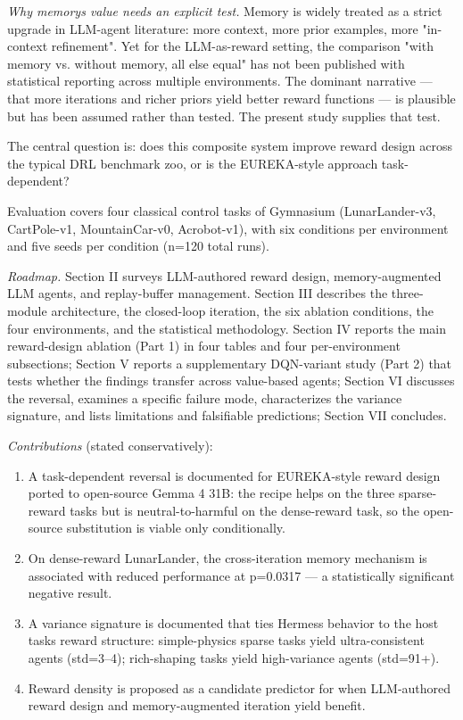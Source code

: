 \documentclass[conference,letterpaper,10pt]{IEEEtran}
\providecommand{\tightlist}{\setlength{\itemsep}{0pt}\setlength{\parskip}{0pt}}
\begin{document}
\emph{Why memory\textquotesingle s value needs an explicit test.} Memory is widely treated as a strict upgrade in LLM-agent literature: more context, more prior examples, more "in-context refinement". Yet for the LLM-as-reward setting, the comparison "with memory vs. without memory, all else equal" has not been published with statistical reporting across multiple environments. The dominant narrative --- that more iterations and richer priors yield better reward functions --- is plausible but has been assumed rather than tested. The present study supplies that test.

The central question is: does this composite system improve reward design across the typical DRL benchmark zoo, or is the EUREKA-style approach task-dependent?

Evaluation covers four classical control tasks of Gymnasium (LunarLander-v3, CartPole-v1, MountainCar-v0, Acrobot-v1), with six conditions per environment and five seeds per condition (n=120 total runs).

\emph{Roadmap.} Section II surveys LLM-authored reward design, memory-augmented LLM agents, and replay-buffer management. Section III describes the three-module architecture, the closed-loop iteration, the six ablation conditions, the four environments, and the statistical methodology. Section IV reports the main reward-design ablation (Part 1) in four tables and four per-environment subsections; Section V reports a supplementary DQN-variant study (Part 2) that tests whether the findings transfer across value-based agents; Section VI discusses the reversal, examines a specific failure mode, characterizes the variance signature, and lists limitations and falsifiable predictions; Section VII concludes.

\emph{Contributions} (stated conservatively):

\begin{enumerate}
\def\labelenumi{\arabic{enumi}.}
\tightlist
\item
  A task-dependent reversal is documented for EUREKA-style reward design ported to open-source Gemma 4 31B: the recipe helps on the three sparse-reward tasks but is neutral-to-harmful on the dense-reward task, so the open-source substitution is viable only conditionally.
\item
  On dense-reward LunarLander, the cross-iteration memory mechanism is associated with reduced performance at p=0.0317 --- a statistically significant negative result.
\item
  A variance signature is documented that ties Hermes\textquotesingle s behavior to the host task\textquotesingle s reward structure: simple-physics sparse tasks yield ultra-consistent agents (std=3--4); rich-shaping tasks yield high-variance agents (std=91+).
\item
  Reward density is proposed as a candidate predictor for when LLM-authored reward design and memory-augmented iteration yield benefit.
\end{enumerate}
\end{document}
